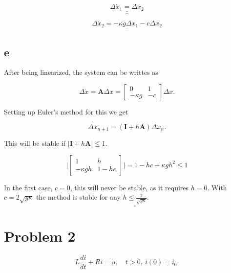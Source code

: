 \documentclass{article}
\begin{document}
\begin{equation*}
    \underline{\underline{\Delta \dot x_1 = \Delta x_2}}
\end{equation*}



\begin{equation*}
     \underline{\underline{\Delta \dot x_2 = -\kappa g \Delta x_1 - c \Delta x_2}}
\end{equation*}

\subsection{e}
After being linearized, the system can be writtes as

\begin{equation*}
    \Delta\dot x = \mathbf{A}\Delta x = \begin{bmatrix}
        0 & 1 \\
        -\kappa g & -c
    \end{bmatrix} \Delta x.
\end{equation*}

Setting up Euler's method for this we get 

\begin{equation*}
    \Delta x_{n+1} = (\mathbf{I} + h\mathbf{A})\Delta x_n.
\end{equation*}

This will be stable if $|\mathbf{I} + h\mathbf{A}| \leq 1$.

\begin{equation*}
    \bigg|\begin{bmatrix}
        1 & h \\
        -\kappa g h & 1-hc
    \end{bmatrix}\bigg| = 1 - hc + \kappa g h^2 \leq 1
\end{equation*}

In the first case, $c = 0$, this will never be stable, as it requires $h = 0$. With $c = 2\sqrt{g\kappa}$ the method is stable for any $\underline{\underline{h \leq \frac{2}{\sqrt{g\kappa}}}}$.

\section{Problem 2}

\begin{equation*}
    L\frac{di}{dt} + Ri = u, \quad t > 0, \: i(0) = i_0.
\end{equation*}
\end{document}
